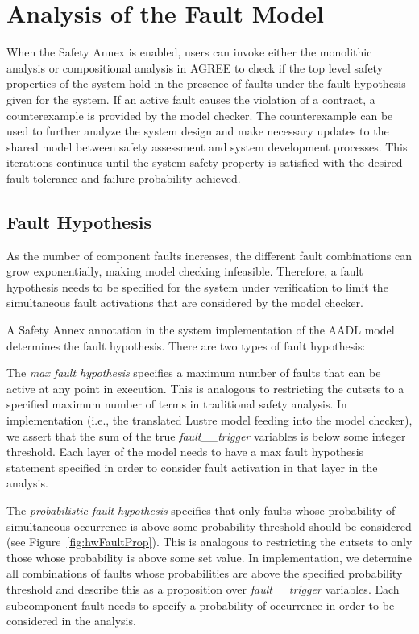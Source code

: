 \section{Analysis of the Fault Model}
\label{sec:fault_analysis}

When the Safety Annex is enabled, users can invoke either the monolithic analysis or compositional analysis in AGREE to check if the top level safety properties of the system hold in the presence of faults under the fault hypothesis given for the system. If an active fault causes the violation of a contract, a counterexample is provided by the model checker. The counterexample can be used to further analyze the system design and make necessary updates to the shared model between safety assessment and system development processes. This iterations continues until the system safety property is satisfied with the desired fault tolerance and failure probability achieved.

\subsection{Fault Hypothesis}
As the number of component faults increases, the different fault combinations can grow exponentially, making model checking infeasible. Therefore, a fault hypothesis needs to be specified for the system under verification to limit the simultaneous fault activations that are considered by the model checker.

A Safety Annex annotation in the system implementation of the AADL model determines the fault hypothesis. There are two types of fault hypothesis:

The \textit{max fault hypothesis} specifies a maximum number of faults that can be active at any point in execution. This is analogous to restricting the cutsets to a specified maximum number of terms in %
traditional safety analysis. In implementation (i.e., the translated Lustre model feeding into the model checker), we assert that the sum of the true {\em fault\_\_trigger} variables is below some integer threshold. Each layer of the model needs to have a max fault hypothesis statement specified in order to consider fault activation in that layer in the analysis.

The \textit{probabilistic fault hypothesis} specifies that only faults whose probability of simultaneous occurrence is above some probability threshold should be considered (see Figure~\ref{fig:hwFaultProp}). This is analogous to restricting the cutsets to only those whose probability is above some set value. In implementation, we determine all combinations of faults whose probabilities are above the specified probability threshold and describe this as a proposition over {\em fault\_\_trigger} variables. Each subcomponent fault needs to specify a probability of occurrence in order to be considered in the analysis.

